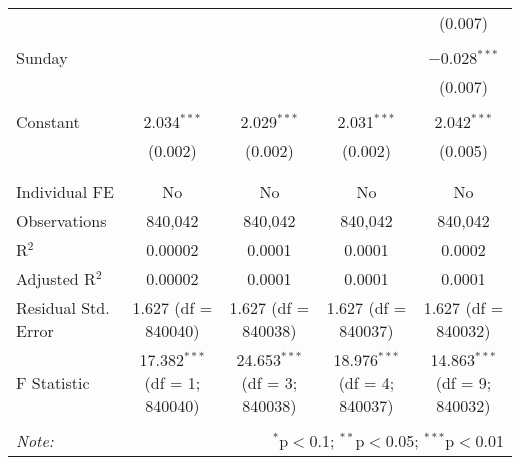 \documentclass[
]{article}
\begin{document}
\begin{table}[!htbp]
{\begin{tabular}{@{\extracolsep{5pt}}lcccc}
  &  &  &  & (0.007) \\ 
  & & & & \\ 
 Sunday &  &  &  & $-$0.028$^{***}$ \\ 
  &  &  &  & (0.007) \\ 
  & & & & \\ 
 Constant & 2.034$^{***}$ & 2.029$^{***}$ & 2.031$^{***}$ & 2.042$^{***}$ \\ 
  & (0.002) & (0.002) & (0.002) & (0.005) \\ 
  & & & & \\ 
\hline \\[-1.8ex] 
Individual FE & No & No & No & No \\ 
Observations & 840,042 & 840,042 & 840,042 & 840,042 \\ 
R$^{2}$ & 0.00002 & 0.0001 & 0.0001 & 0.0002 \\ 
Adjusted R$^{2}$ & 0.00002 & 0.0001 & 0.0001 & 0.0001 \\ 
Residual Std. Error & 1.627 (df = 840040) & 1.627 (df = 840038) & 1.627 (df = 840037) & 1.627 (df = 840032) \\ 
F Statistic & 17.382$^{***}$ (df = 1; 840040) & 24.653$^{***}$ (df = 3; 840038) & 18.976$^{***}$ (df = 4; 840037) & 14.863$^{***}$ (df = 9; 840032) \\ 
\hline 
\hline \\[-1.8ex] 
\textit{Note:}  & \multicolumn{4}{r}{$^{*}$p$<$0.1; $^{**}$p$<$0.05; $^{***}$p$<$0.01} \\ 
\end{tabular}
} 
\end{table} 
\newpage
\end{document}
